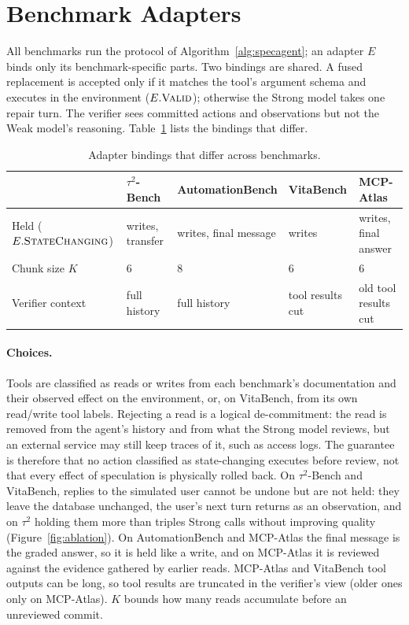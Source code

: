 \documentclass[11pt, copyright, logo, secondlogo]{template/lark}
\begin{document}
\section{Benchmark Adapters}
\label{sec:appendix_adapters}

All benchmarks run the protocol of Algorithm~\ref{alg:specagent}; an adapter
$E$ binds only its benchmark-specific parts. Two bindings are shared. A
fused replacement is accepted only if it matches the tool's argument schema
and executes in the environment ($E.\textsc{Valid}$); otherwise the Strong
model takes one repair turn. The verifier sees committed actions and
observations but not the Weak model's reasoning. Table~\ref{tab:adapters}
lists the bindings that differ.

\begin{table}[h]
\caption{Adapter bindings that differ across benchmarks.}
\label{tab:adapters}
\centering
\footnotesize
\setlength{\tabcolsep}{4pt}
\begin{tabular}{@{}lllll@{}}
\toprule
 & $\tau^2$-Bench & AutomationBench & VitaBench & MCP-Atlas \\
\midrule
Held ($E.\textsc{StateChanging}$) & writes, transfer & writes, final message & writes & writes, final answer \\
Chunk size $K$ & 6 & 8 & 6 & 6 \\
Verifier context & full history & full history & tool results cut & old tool results cut \\
\bottomrule
\end{tabular}
\end{table}

\paragraph{Choices.}
Tools are classified as reads or writes from each benchmark's documentation
and their observed effect on the environment, or, on VitaBench, from its own
read/write tool labels. Rejecting a read is a logical
de-commitment: the read is removed from the agent's history and from what the
Strong model reviews, but an external service may still keep traces of it,
such as access logs. The guarantee is therefore that no action classified as
state-changing executes before review, not that every effect of speculation
is physically rolled back. On $\tau^2$-Bench and VitaBench, replies to the
simulated user cannot be undone but are not held: they leave the database
unchanged, the user's next turn returns as an observation, and on $\tau^2$
holding them more than triples Strong calls without improving quality
(Figure~\ref{fig:ablation}).
On AutomationBench and MCP-Atlas the final message is the graded answer, so
it is held like a write, and on MCP-Atlas it is reviewed against the evidence
gathered by earlier reads. MCP-Atlas and VitaBench tool outputs can be long, so
tool results are truncated in the verifier's view (older ones only on
MCP-Atlas). $K$ bounds how many reads
accumulate before an unreviewed commit.
\end{document}
